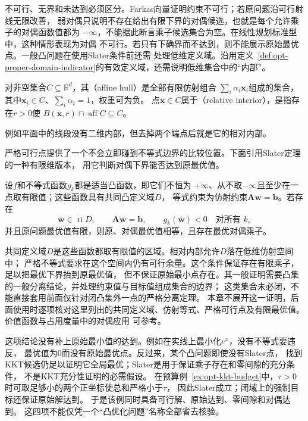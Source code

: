 不可行、无界和未达到必须区分。Farkas向量证明约束不可行；若原问题沿可行射线无限改善，
弱对偶只说明不存在给出有限下界的对偶候选，也就是每个允许乘子的对偶函数值都为
$-\infty$，不能据此断言乘子候选集合为空。在线性规划标准型中，这种情形表现为对偶
不可行。若只有下确界而不达到，则不能展示原始最优点。一般凸问题在使用Slater条件前还需
处理低维定义域。沿用定义~\ref{def:opt-proper-domain-indicator}的有效定义域，还需说明低维集合中的“内部”。
\begin{definition}[仿射包与相对内部]
\label{def:opt-affine-hull-relative-interior}
对非空集合$C\subseteq\mathbb R^d$，其（affine hull）是全部有限仿射组合
$\sum_i\alpha_i\bm x_i$组成的集合，其中$\bm x_i\in C$、$\sum_i\alpha_i=1$，权重可为负。
点$\bm x\in C$属于（relative interior），是指存在$r>0$使
$B(\bm x,r)\cap\operatorname{aff}C\subseteq C$。
\end{definition}

例如平面中的线段没有二维内部，但去掉两个端点后就是它的相对内部。

严格可行点提供了一个不会立即碰到不等式边界的比较位置。下面引用Slater定理的一种有限维版本，
用它判断对偶下界能否达到原最优值。
\begin{theorem}[Slater条件下的强对偶]
设$f$和不等式函数$g_k$都是适当凸函数，即它们不恒为
$+\infty$、从不取$-\infty$且至少在一点取有限值；这些函数具有共同凸定义域$D$，
等式约束为仿射约束$\bm{A}\bm{w}=\bm{b}$。若存在
\[
  \bar{\bm{w}}\in\operatorname{ri}D,\qquad
  \bm{A}\bar{\bm{w}}=\bm{b},\qquad
  g_k(\bar{\bm{w}})<0\quad\text{对所有 }k,
\]
并且原问题最优值有限，则原、对偶最优值相等，且存在最优对偶乘子。
\end{theorem}
共同定义域$D$是这些函数都取有限值的区域。相对内部允许$D$落在低维仿射空间中；
严格不等式要求在这个空间内仍有可行余量。这个条件保证存在有限乘子，足以把最优下界抬到原最优值，
但不保证原始最小点存在。其一般证明需要凸集的一般分离结论，并处理约束值与目标值组成集合的边界；
这类集合未必闭，不能直接套用前面仅针对闭凸集外一点的严格分离定理。
本章不展开这一证明，后面使用时逐项核对这里列出的共同定义域、仿射等式、严格可行点及有限最优值。价值函数与占用度量中的对偶应用
可参考。

这项结论没有补上原始最小值的达到。例如在实线上最小化$e^x$，没有不等式要违反，
最优值为$0$而没有原始最优点。反过来，某个凸问题即使没有Slater点，
找到KKT候选仍足以证明它全局最优；Slater是用于保证乘子存在和零间隙的充分条件，
不是KKT充分性证明的必需假设。
在预算例~\ref{ex:opt-kkt-budget}中，$\tau>0$时可取足够小的两个正坐标使总和严格小于$\tau$，
因此Slater成立；闭域上的强制目标还保证原始解达到。
于是该例同时具备可行解、原始达到、零间隙和对偶达到。
这四项不能仅凭一个“凸优化问题”名称全部省去核验。

